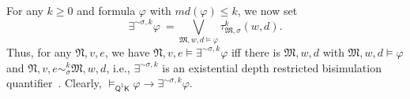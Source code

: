 \documentclass[10pt,a4paper]{amsart}
\theoremstyle{plain}
\newtheorem{lemma}[thm]{Lemma}
\theoremstyle{definition}
\newcommand{\md}{\textit{md}}
\newcommand{\FOMK}{\ensuremath{\mathsf{Q^1K}}}
\newcommand{\bs}{\boldsymbol{\beta}}
\begin{document}
%
%
For any $k\geq 0$ and formula $\varphi$ with $\md(\varphi) \leq k$, we now set 
%
$$
\exists^{\sim\sigma,k}\varphi ~= \bigvee_{\mathfrak{M},w,d \models \varphi} \tau_{\mathfrak{M},\sigma}^{k}(w,d).
$$
%
Thus, for any $\mathfrak{N},v,e$, we have $\mathfrak{N},v,e \models \exists^{\sim\sigma,k}\varphi$ iff there is $\mathfrak{M},w,d$ with $\mathfrak{M},w,d \models \varphi$ and $\mathfrak{N},v,e \sim_{\sigma}^{k} \mathfrak{M},w,d$, i.e., $\exists^{\sim\sigma,k}$ is an existential depth restricted bisimulation quantifier~\cite{DBLP:journals/japll/DAgostinoL06,French06}. Clearly, $\models_\FOMK \varphi \rightarrow \exists^{\sim\sigma,k}\varphi$. 
\end{document}
